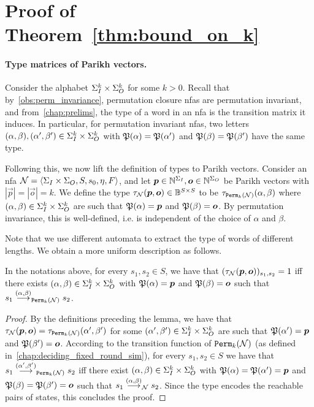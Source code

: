 \section{Proof of Theorem~\ref{thm:bound_on_k}}
\label{sec:proof_of_bound}

\paragraph*{Type matrices of Parikh vectors.}
Consider the alphabet $\Sigma_{I}^k\times \Sigma_{O}^k$ for some $k>0$.
Recall that by~\cref{obs:perm_invariance}, permutation closure \glspl{nfa} are permutation invariant, and from~\cref{chap:prelims}, the type of a word in an \gls{nfa} is the transition matrix it induces.
In particular, for permutation invariant \glspl{nfa}, two letters $(\alpha,\beta),(\alpha',\beta')\in \Sigma_{I}^k\times \Sigma_{O}^k$ with $\mathfrak{P}(\alpha)=\mathfrak{P}(\alpha')$ and $\mathfrak{P}(\beta)=\mathfrak{P}(\beta')$ have the same type.

Following this, we now lift the definition of types to Parikh vectors. Consider an \gls{nfa} $\mathcal{N}=\left< \Sigma_{I}\times \Sigma_{O},S,s_0,\eta,F\right>$, and let $\boldsymbol{p}\in \mathbb{N}^{\Sigma_{I}},\boldsymbol{o}\in \mathbb{N}^{\Sigma_{O}}$ be Parikh vectors with $|\vec{p}|=|\vec{o}|=k$. We define the type $\tau_{\mathcal{N}}(\boldsymbol{p},\boldsymbol{o})\in \mathbb{B}^{S\times S}$ to be $\tau_{{\mathtt{Perm}}_k(\mathcal{N})}(\alpha,\beta)$ where $(\alpha,\beta)\in \Sigma_{I}^k\times \Sigma_{O}^k$ are such that $\mathfrak{P}(\alpha)=\boldsymbol{p}$ and $\mathfrak{P}(\beta)=\boldsymbol{o}$. By permutation invariance, this is well-defined, i.e. is independent of the choice of $\alpha$ and $\beta$.

Note that we use different automata to extract the type of words of different lengths. We obtain a more uniform description as follows.
\begin{lemma}
\label{lem:type_of_parikh}
    In the notations above, for every $s_1,s_2\in S$, we have that $(\tau_{\mathcal{N}}(\boldsymbol{p},\boldsymbol{o}))_{s_1,s_2}=1$ iff there exists $(\alpha,\beta)\in \Sigma_{I}^k\times \Sigma_{O}^k$ with $\mathfrak{P}(\alpha)=\boldsymbol{p}$ and $\mathfrak{P}(\beta)=\boldsymbol{o}$ such that $s_1\stackrel{(\alpha,\beta)}{\longrightarrow}_{{\mathtt{Perm}}_k(\mathcal{N})}s_2$.
\end{lemma}
\begin{proof}
    By the definitions preceding the lemma, we have that $\tau_{\mathcal{N}}(\boldsymbol{p},\boldsymbol{o})=\tau_{{\mathtt{Perm}}_k(\mathcal{N})}(\alpha',\beta')$ for some $(\alpha',\beta')\in \Sigma_{I}^k\times \Sigma_{O}^k$ are such that $\mathfrak{P}(\alpha')=\boldsymbol{p}$ and $\mathfrak{P}(\beta')=\boldsymbol{o}$. According to the transition function of ${\mathtt{Perm}}_k(\mathcal{N})$ (as defined in~\cref{chap:deciding_fixed_round_sim}), for every $s_1,s_2\in S$ we have that $s_1\stackrel{(\alpha',\beta')}{\longrightarrow}_{{\mathtt{Perm}}_k(\mathcal{N})}s_2$ iff there exist $(\alpha,\beta)\in \Sigma_{I}^k\times \Sigma_{O}^k$ with $\mathfrak{P}(\alpha)=\mathfrak{P}(\alpha')=\boldsymbol{p}$ and $\mathfrak{P}(\beta)=\mathfrak{P}(\beta')=\boldsymbol{o}$ such that $s_1\stackrel{(\alpha,\beta)}{\longrightarrow}_{\mathcal{N}}s_2$. Since the type encodes the reachable pairs of states, this concludes the proof.
\end{proof}

